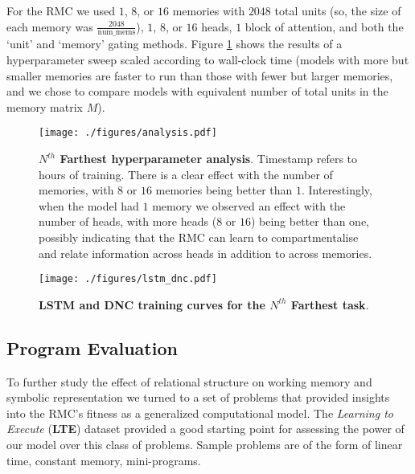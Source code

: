 \documentclass{article}
\begin{document}
For the RMC we used $1$, $8$, or $16$ memories with $2048$ total units (so, the size of each memory was $\frac{2048}{\text{num\_mems}}$), $1$, $8$, or $16$ heads, $1$ block of attention, and both the `unit' and `memory' gating methods. Figure \ref{fig:hp_analysis} shows the results of a hyperparameter sweep scaled according to wall-clock time (models with more but smaller memories are faster to run than those with fewer but larger memories, and we chose to compare models with equivalent number of total units in the memory matrix $M$). 

\begin{figure}[h]
    \centering
    \texttt{[image: ./figures/analysis.pdf]}
    \caption{\textbf{$N^{th}$ Farthest hyperparameter analysis}. Timestamp refers to hours of training. There is a clear effect with the number of memories, with $8$ or $16$ memories being better than $1$. Interestingly, when the model had $1$ memory we observed an effect with the number of heads, with more heads ($8$ or $16$) being better than one, possibly indicating that the RMC can learn to compartmentalise and relate information across heads in addition to across memories.}
    \label{fig:hp_analysis}
\end{figure}

\begin{figure}
    \centering
    \texttt{[image: ./figures/lstm\_dnc.pdf]}
    \caption{\textbf{LSTM and DNC training curves for the $N^{th}$ Farthest task}. }
    \label{fig:lstm_dnc}
\end{figure}

\subsection{Program Evaluation}
To further study the effect of relational structure on working memory and symbolic representation we turned to a set of problems that provided insights into the RMC's fitness as a generalized computational model.  The \textit{Learning to Execute} (\textbf{LTE}) dataset \cite{zaremba2014lte} provided a good starting point for assessing the power of our model over this class of problems.  Sample problems are of the form of linear time, constant memory, mini-programs.
\end{document}
